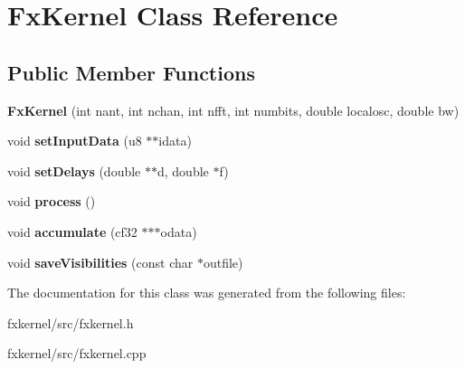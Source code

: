 \hypertarget{classFxKernel}{}\section{Fx\+Kernel Class Reference}
\label{classFxKernel}
\subsection*{Public Member Functions}
\begin{DoxyCompactItemize}
\item 
{\bfseries Fx\+Kernel} (int nant, int nchan, int nfft, int numbits, double localosc, double bw)\hypertarget{classFxKernel_a86d4996573ac8c6244323b7fa299c315}{}\label{classFxKernel_a86d4996573ac8c6244323b7fa299c315}

\item 
void {\bfseries set\+Input\+Data} (u8 $\ast$$\ast$idata)\hypertarget{classFxKernel_a82ed167e38578d48e3d956992aa2d0b0}{}\label{classFxKernel_a82ed167e38578d48e3d956992aa2d0b0}

\item 
void {\bfseries set\+Delays} (double $\ast$$\ast$d, double $\ast$f)\hypertarget{classFxKernel_a22ca9951ed0f452c832b1d10e29d54f6}{}\label{classFxKernel_a22ca9951ed0f452c832b1d10e29d54f6}

\item 
void {\bfseries process} ()\hypertarget{classFxKernel_a7086f405fc5c807857289ab5def9f56e}{}\label{classFxKernel_a7086f405fc5c807857289ab5def9f56e}

\item 
void {\bfseries accumulate} (cf32 $\ast$$\ast$$\ast$odata)\hypertarget{classFxKernel_af1690f309b16bba6d9d73c109d2db9ba}{}\label{classFxKernel_af1690f309b16bba6d9d73c109d2db9ba}

\item 
void {\bfseries save\+Visibilities} (const char $\ast$outfile)\hypertarget{classFxKernel_a6235ee9444c2c8b9d17db9591445f990}{}\label{classFxKernel_a6235ee9444c2c8b9d17db9591445f990}

\end{DoxyCompactItemize}


The documentation for this class was generated from the following files\+:\begin{DoxyCompactItemize}
\item 
fxkernel/src/fxkernel.\+h\item 
fxkernel/src/fxkernel.\+cpp\end{DoxyCompactItemize}
